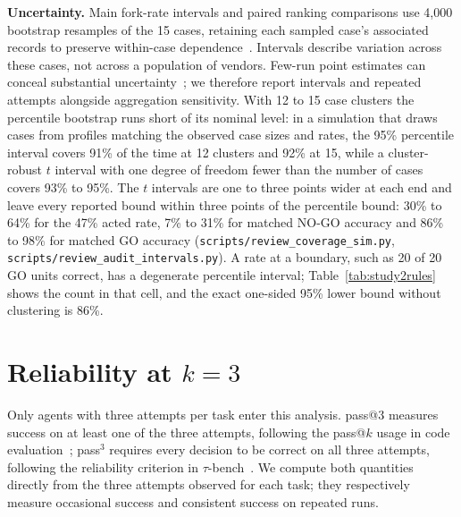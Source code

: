 \documentclass{article}
\begin{document}
\begin{table}[!htbp]
\caption{Sensitivity of the \sensNSystems{}-agent ranking to alternative combinations of the same scored components (attempt 1). Columns give rank correlation, top-three retention and rank changes.}
\label{tab:sens}
\centering
\footnotesize
\setlength{\tabcolsep}{3.5pt}


\end{table}

\textbf{Uncertainty.} Main fork-rate intervals and paired ranking comparisons use
4,000 bootstrap resamples of the 15 cases, retaining each sampled case's associated
records to preserve within-case dependence~\citep{field2007clusterbootstrap}.
Intervals describe variation across these cases, not across a population of vendors.
Few-run point estimates can conceal substantial uncertainty~\citep{agarwal2021precipice};
we therefore report intervals and repeated attempts alongside aggregation sensitivity.
With 12 to 15 case clusters the percentile bootstrap runs short of its nominal level: in a simulation that draws cases from profiles matching the observed case sizes and rates, the 95\% percentile interval covers 91\% of the time at 12 clusters and 92\% at 15, while a cluster-robust $t$ interval with one degree of freedom fewer than the number of cases covers 93\% to 95\%. The $t$ intervals are one to three points wider at each end and leave every reported bound within three points of the percentile bound: 30\% to 64\% for the 47\% acted rate, 7\% to 31\% for matched NO-GO accuracy and 86\% to 98\% for matched GO accuracy (\nolinkurl{scripts/review_coverage_sim.py}, \nolinkurl{scripts/review_audit_intervals.py}). A rate at a boundary, such as 20 of 20 GO units correct, has a degenerate percentile interval; Table~\ref{tab:study2rules} shows the count in that cell, and the exact one-sided 95\% lower bound without clustering is 86\%.

\section{Reliability at \texorpdfstring{$k=3$}{k=3}}
\label{app:reliability}

Only agents with three attempts per task enter this analysis. pass@3 measures success
on at least one of the three attempts, following the pass@$k$ usage in code
evaluation~\citep{chen2021codex}; pass$^3$ requires every decision to be correct on
all three attempts, following the reliability criterion in $\tau$-bench~\citep{yao2024taubench}.
We compute both quantities directly from the three attempts observed for each task; they respectively measure occasional success and consistent success on repeated runs.
\end{document}
